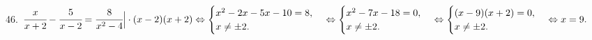 46. $\cfrac{x}{x+2}-\cfrac{5}{x-2}=\cfrac{8}{x^2-4}\Big|\cdot(x-2)(x+2)\Leftrightarrow\begin{cases}x^2-2x-5x-10=8,\\x\neq\pm2.\end{cases}
\Leftrightarrow\begin{cases}x^2-7x-18=0,\\x\neq\pm2.\end{cases}\Leftrightarrow\begin{cases}(x-9)(x+2)=0,\\x\neq\pm2.\end{cases}\Leftrightarrow x=9.$\\
